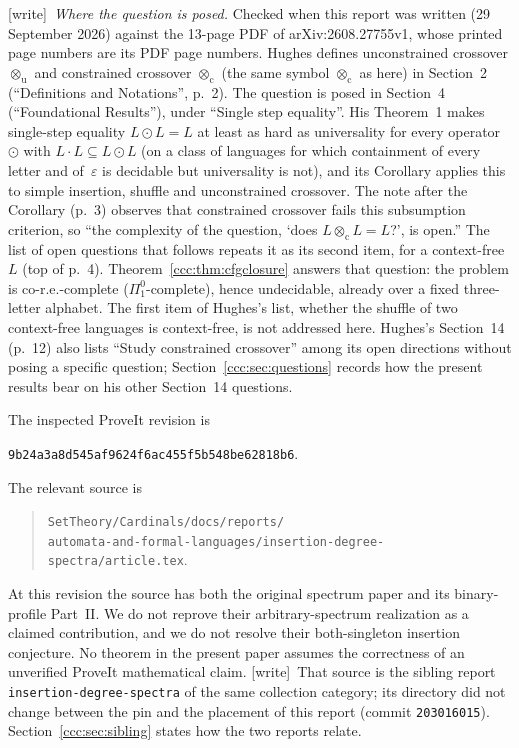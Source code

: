 \documentclass[11pt,letterpaper]{article}
\theoremstyle{definition}
\theoremstyle{remark}
\newcommand{\eps}{\varepsilon}
\newcommand{\cut}{\otimes_{\mathrm c}}
\newcommand{\wtag}{\textup{[write]}}
\begin{document}
\wtag\ \emph{Where the question is posed.} Checked when this report was
written (29 September 2026) against the 13-page PDF of
arXiv:2608.27755v1, whose printed page numbers are its PDF page numbers.
Hughes defines unconstrained crossover $\otimes_{\mathrm u}$ and constrained
crossover $\otimes_{\mathrm c}$ (the same symbol $\cut$ as here) in Section~2 (``Definitions
and Notations'', p.~2). The question is posed in Section~4 (``Foundational
Results''), under ``Single step equality''. His Theorem~1 makes single-step
equality $L\odot L=L$ at least as hard as universality for every operator
$\odot$ with $L\cdot L\subseteq L\odot L$ (on a class of languages for
which containment of every letter and of~$\eps$ is decidable but universality
is not), and its Corollary applies this to
simple insertion, shuffle and unconstrained crossover. The note after the
Corollary (p.~3) observes that constrained crossover fails this subsumption
criterion, so ``the complexity of the question, `does $L\cut L=L$?', is
open.'' The list of open questions that follows repeats it as its second item,
for a context-free~$L$ (top of p.~4). Theorem~\ref{ccc:thm:cfgclosure} answers
that question: the problem is co-r.e.-complete ($\Pi^0_1$-complete), hence
undecidable, already over a fixed three-letter alphabet. The first item of
Hughes's list, whether the shuffle of two context-free languages is
context-free, is not addressed here. Hughes's Section~14 (p.~12) also lists
``Study constrained crossover'' among its open directions without posing a
specific question; Section~\ref{ccc:sec:questions} records how the present
results bear on his other Section~14 questions.

The inspected ProveIt revision is
\begin{center}\small
\nolinkurl{9b24a3a8d545af9624f6ac455f5b548be62818b6}.
\end{center}
The relevant source is
\begin{quote}\small
\nolinkurl{SetTheory/Cardinals/docs/reports/}\\
\nolinkurl{automata-and-formal-languages/insertion-degree-spectra/article.tex}.
\end{quote}
At this revision the source has both the original spectrum paper and its
binary-profile Part~II. We do not reprove their arbitrary-spectrum realization
as a claimed contribution, and we do not resolve their both-singleton
insertion conjecture. No theorem in the present paper assumes the correctness
of an unverified ProveIt mathematical claim.
\wtag\ That source is the sibling report \texttt{insertion-degree-spectra} of
the same collection category; its directory did not change between the pin
and the placement of this report (commit \texttt{203016015}).
Section~\ref{ccc:sec:sibling} states how the two reports relate.
\end{document}
